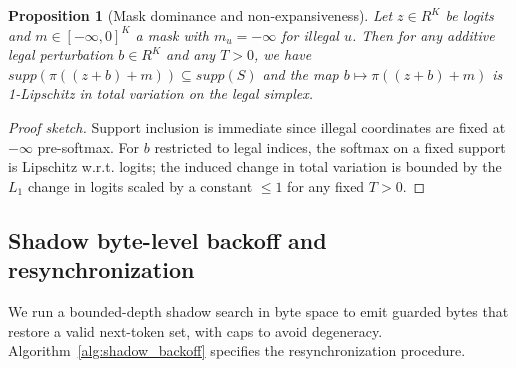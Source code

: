 \documentclass{article}
\def\mathcal#1{#1}%
\def\mathrm#1{#1}%
\def\mathbb#1{#1}%
\newtheorem{proposition}{Proposition}
\begin{document}
\begin{proposition}[Mask dominance and non-expansiveness]
Let $z\in\mathbb{R}^K$ be logits and $m\in[-\infty,0]^K$ a mask with $m_u=-\infty$ for illegal $u$. Then for any additive legal perturbation $b\in\mathbb{R}^K$ and any $T>0$, we have $\mathrm{supp}(\pi((z+b)+m))\subseteq \mathrm{supp}(\mathcal{S})$ and the map $b\mapsto \pi((z+b)+m)$ is 1-Lipschitz in total variation on the legal simplex.
\end{proposition}

\begin{proof}[Proof sketch]
Support inclusion is immediate since illegal coordinates are fixed at $-\infty$ pre-softmax. For $b$ restricted to legal indices, the softmax on a fixed support is Lipschitz w.r.t. logits; the induced change in total variation is bounded by the $L_1$ change in logits scaled by a constant $\le 1$ for any fixed $T>0$.
\end{proof}

\subsection{Shadow byte-level backoff and resynchronization}
We run a bounded-depth shadow search in byte space to emit guarded bytes that restore a valid next-token set, with caps to avoid degeneracy. Algorithm~\ref{alg:shadow_backoff} specifies the resynchronization procedure.
\end{document}
